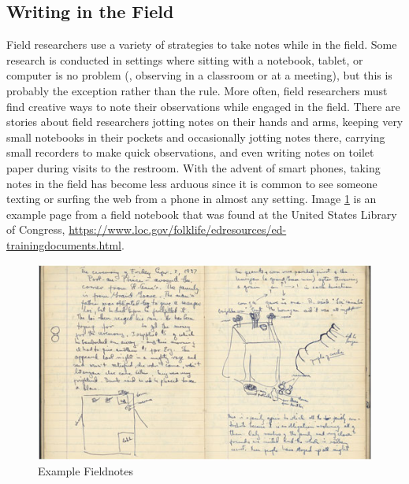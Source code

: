 \subsection{Writing in the Field}

Field researchers use a variety of strategies to take notes while in the field. Some research is conducted in settings where sitting with a notebook, tablet, or computer is no problem (\eg, observing in a classroom or at a meeting), but this is probably the exception rather than the rule. More often, field researchers must find creative ways to note their observations while engaged in the field. There are stories about field researchers jotting notes on their hands and arms, keeping very small notebooks in their pockets and occasionally jotting notes there, carrying small recorders to make quick observations, and even writing notes on toilet paper during visits to the restroom. With the advent of smart phones, taking notes in the field has become less arduous since it is common to see someone texting or surfing the web from a phone in almost any setting. Image \ref{11:fieldnote} is an example page from a field notebook that was found at the United States Library of Congress, \url{https://www.loc.gov/folklife/edresources/ed-trainingdocuments.html}.

\begin{figure}[H]
	\centering
	\includegraphics[width=\maxwidth{.95\linewidth}]{gfx/11-fieldnote}
	\caption{Example Fieldnotes}
	\label{11:fieldnote}
\end{figure}

